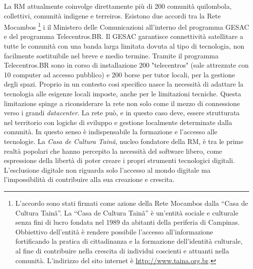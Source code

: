 La RM attualmente coinvolge direttamente più di 200 comunità
quilombola, collettivi, comunità indigene e terreiros. Esistono due
accordi tra la Rete Mocambos \footnote{L'accordo sono stati firmati
  come azione della Rete Mocambos dalla ``Casa de Cultura Tainã''. La
  ``Casa de Cultura Tainã'' è un'entità sociale e culturale senza fini
  di lucro fondata nel 1989 da abitanti della periferia di
  Campinas. Obbiettivo dell'entità è rendere possibile l'accesso
  all'informazione fortificando la pratica di cittadinanza e la
  formazione dell'identità culturale, al fine di contribuire nella
  crescita di individui coscienti e attuanti nella
  comunità. L'indirizzo del sito internet è
  \url{http://www.taina.org.br}.} i il Ministero delle Comunicazioni
all'interno del programma GESAC e del programma Telecentros.BR. Il
GESAC garantisce connettività satellitare a tutte le comunità con una
banda larga limitata dovuta al tipo di tecnologia, non facilmente
sostituibile nel breve e medio termine. Tramite il programma
Telecentros.BR sono in corso di installazione 200 "telecentros" (sale
attrezzate con 10 computer ad accesso pubblico) e 200 borse per tutor
locali, per la gestione degli spazi. Proprio in un contesto cosi
specifico nasce la necessità di adattare la tecnologia alle esigenze
locali imposte, anche per le limitazioni tecniche. Questa limitazione
spinge a riconsiderare la rete non solo come il mezzo di connessione
verso i grandi \emph{datacenter}. La rete può, e in questo caso deve,
essere strutturata nel territorio con logiche di sviluppo e gestione
localmente determinate dalla comunità. In questo senso è
indispensabile la formazione e l'accesso alle tecnologie. La
\emph{Casa de Cultura Tainã}, nucleo fondatore della RM, è tra le
prime realtà popolari che hanno percepito la necessità del software
libero, come espressione della libertà di poter creare i propri
strumenti tecnologici digitali. L'esclusione digitale non riguarda
solo l'accesso al mondo digitale ma l'impossibilità di contribuire
alla sua creazione e crescita.

